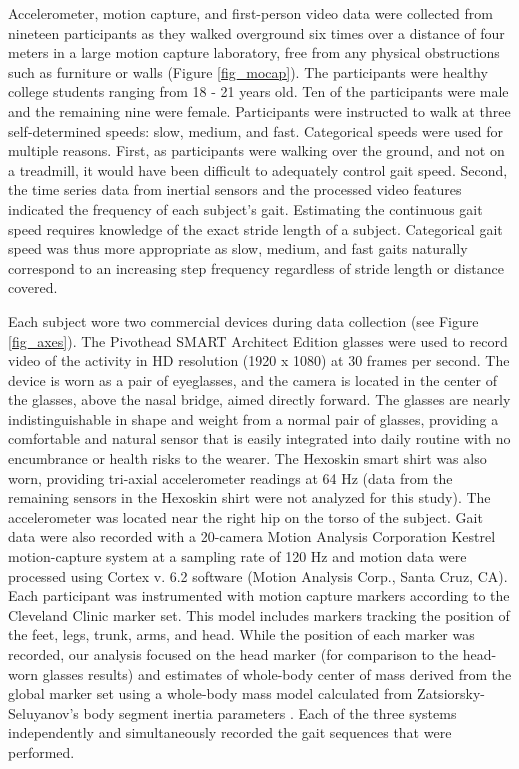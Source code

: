\documentclass[12pt]{report}
\begin{document}
Accelerometer, motion capture, and first-person video data were collected from nineteen participants as they walked overground six times over a distance of four meters in a large motion capture laboratory, free from any physical obstructions such as furniture or walls (Figure \ref{fig_mocap}). The participants were healthy college students ranging from 18 - 21 years old. Ten of the participants were male and the remaining nine were female. Participants were instructed to walk at three self-determined speeds: slow, medium, and fast. Categorical speeds were used for multiple reasons. First, as participants were walking over the ground, and not on a treadmill, it would have been difficult to adequately control gait speed. Second, the time series data from inertial sensors and the processed video features indicated the frequency of each subject's gait. Estimating the continuous gait speed requires knowledge of the exact stride length of a subject. Categorical gait speed was thus more appropriate as slow, medium, and fast gaits naturally correspond to an increasing step frequency regardless of stride length or distance covered.

Each subject wore two commercial devices during data collection (see Figure \ref{fig_axes}). The Pivothead SMART Architect Edition glasses \cite{Pivothead2017Pivothead} were used to record video of the activity in HD resolution (1920 x 1080) at 30 frames per second. The device is worn as a pair of eyeglasses, and the camera is located in the center of the glasses, above the nasal bridge, aimed directly forward. The glasses are nearly indistinguishable in shape and weight from a normal pair of glasses, providing a comfortable and natural sensor that is easily integrated into daily routine with no encumbrance or health risks to the wearer. The Hexoskin smart shirt \cite{CarreTechnologies2017HexoskinShirts, Banerjee2017ValidatingManagement} was also worn, providing tri-axial accelerometer readings at 64 Hz (data from the remaining sensors in the Hexoskin shirt were not analyzed for this study). The accelerometer was located near the right hip on the torso of the subject. Gait data were also recorded with a 20-camera Motion Analysis Corporation Kestrel motion-capture system at a sampling rate of 120 Hz and motion data were processed using Cortex v. 6.2 software (Motion Analysis Corp., Santa Cruz, CA). Each participant was instrumented with motion capture markers according to the Cleveland Clinic marker set. This model includes markers tracking the position of the feet, legs, trunk, arms, and head. While the position of each marker was recorded, our analysis focused on the head marker (for comparison to the head-worn glasses results) and estimates of whole-body center of mass derived from the global marker set using a whole-body mass model calculated from Zatsiorsky-Seluyanov's body segment inertia parameters \cite{deLeva1996AdjustmentsParameters}. Each of the three systems independently and simultaneously recorded the gait sequences that were performed.
\end{document}
